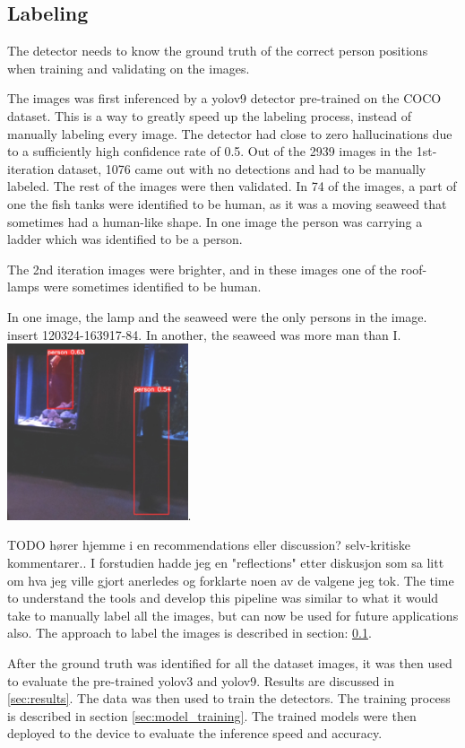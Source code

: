 \subsection{Labeling}
\label{sec:labeling}
The detector needs to know the ground truth of the correct person positions when training and validating on the images. 

The images was first inferenced by a yolov9 detector pre-trained on the COCO dataset. This is a way to greatly speed up the labeling process, instead of manually labeling every image. The detector had close to zero hallucinations due to a sufficiently high confidence rate of 0.5. Out of the 2939 images in the 1st-iteration dataset, 1076 came out with no detections and had to be manually labeled. The rest of the images were then validated. In 74 of the images, a part of one the fish tanks were identified to be human, as it was a moving seaweed that sometimes had a human-like shape. In one image the person was carrying a ladder which was identified to be a person. 

The 2nd iteration images were brighter, and in these images one of the roof-lamps were sometimes identified to be human.

In one image, the lamp and the seaweed were the only persons in the image. insert 120324-163917-84. 
In another, the seaweed was more man than I. \includegraphics[width=0.4\textwidth]{Images/Fun/seaweed-man-more-than-I.png}.

TODO hører hjemme i en recommendations eller discussion? selv-kritiske kommentarer.. I forstudien hadde jeg en "reflections" etter diskusjon som sa litt om hva jeg ville gjort anerledes og forklarte noen av de valgene jeg tok. 
The time to understand the tools and develop this pipeline was similar to what it would take to manually label all the images, but can now be used for future applications also. The approach to label the images is described in section: \ref{sec:labeling}.

After the ground truth was identified for all the dataset images, it was then used to evaluate the pre-trained yolov3 and yolov9. Results are discussed in \ref{sec:results}. The data was then used to train the detectors. The training process is described in section \ref{sec:model_training}. The trained models were then deployed to the device to evaluate the inference speed and accuracy.

